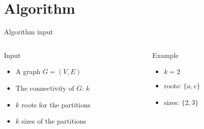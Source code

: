 \newcommand{\columntitle}[1]{{\begin{center} \Large #1 \end{center}}}

\section{Algorithm}
\begin{frame}{Algorithm input}
  \begin{columns}[c]
    \begin{column}[T]{.5\textwidth}
      \columntitle{Input}
      \begin{itemize}
      \item A graph $G = (V,E)$
      \item The connectivity of $G$: $k$
      \item $k$ roots for the partitions
      \item $k$ sizes of the partitions
      \end{itemize}
    \end{column}
    \begin{column}[T]{.5\textwidth}
      \columntitle{Example}
      \begin{itemize}
      \item $k = 2$
      \item roots: $\{a, e\}$
      \item sizes: $\{2, 3\}$
      \end{itemize}
      \begin{tikzpicture}[scale=0.5]
        
      \end{tikzpicture}
    \end{column}
  \end{columns}
\end{frame}
